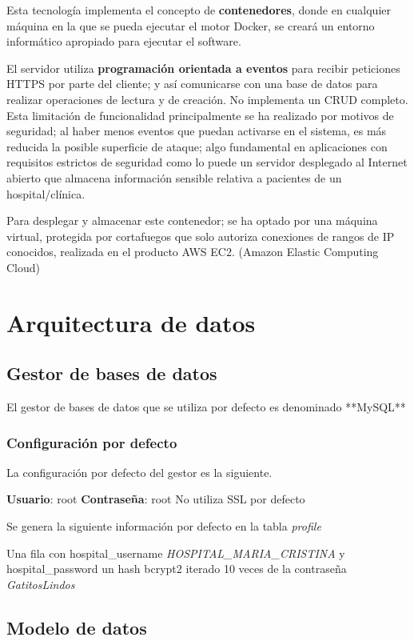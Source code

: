 \documentclass[12pt,a4paper,twoside,openright]{book}
\begin{document}
Esta tecnología implementa el concepto de \textbf{contenedores}, donde en cualquier máquina en la que se pueda ejecutar el motor Docker, se creará un entorno informático apropiado para ejecutar el software.

El servidor utiliza \textbf{programación orientada a eventos} para recibir peticiones HTTPS por parte del cliente; y así comunicarse con una base de datos para realizar operaciones de lectura y de creación. No implementa un CRUD completo. Esta limitación de funcionalidad principalmente se ha realizado por motivos de seguridad; al haber menos eventos que puedan activarse en el sistema, es más reducida la posible superficie de ataque; algo fundamental en aplicaciones con requisitos estrictos de seguridad como lo puede un servidor desplegado al Internet abierto que almacena información sensible relativa a pacientes de un hospital/clínica.

Para desplegar y almacenar este contenedor; se ha optado por una máquina virtual, protegida por cortafuegos que solo autoriza conexiones de rangos de IP conocidos, realizada en el producto AWS EC2. (Amazon Elastic Computing Cloud)

\section{Arquitectura de datos}

\subsection{Gestor de bases de datos}

El gestor de bases de datos que se utiliza por defecto es denominado **MySQL**

\subsubsection{Configuración por defecto}

La configuración por defecto del gestor es la siguiente.

\textbf{Usuario}: root
\textbf{Contraseña}: root
No utiliza SSL por defecto

Se genera la siguiente información por defecto en la tabla \textit{profile}

Una fila con hospital\_username \textit{HOSPITAL\_MARIA\_CRISTINA} y hospital\_password un hash bcrypt2 iterado 10 veces de la contraseña \textit{GatitosLindos}

\subsection{Modelo de datos}
\end{document}
